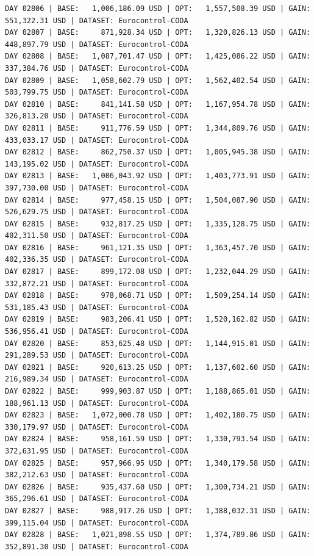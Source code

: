 \documentclass[11pt,a4paper]{article}
\begin{document}
\begin{verbatim}
DAY 02806 | BASE:   1,006,186.09 USD | OPT:   1,557,508.39 USD | GAIN: 551,322.31 USD | DATASET: Eurocontrol-CODA
DAY 02807 | BASE:     871,928.34 USD | OPT:   1,320,826.13 USD | GAIN: 448,897.79 USD | DATASET: Eurocontrol-CODA
DAY 02808 | BASE:   1,087,701.47 USD | OPT:   1,425,086.22 USD | GAIN: 337,384.76 USD | DATASET: Eurocontrol-CODA
DAY 02809 | BASE:   1,058,602.79 USD | OPT:   1,562,402.54 USD | GAIN: 503,799.75 USD | DATASET: Eurocontrol-CODA
DAY 02810 | BASE:     841,141.58 USD | OPT:   1,167,954.78 USD | GAIN: 326,813.20 USD | DATASET: Eurocontrol-CODA
DAY 02811 | BASE:     911,776.59 USD | OPT:   1,344,809.76 USD | GAIN: 433,033.17 USD | DATASET: Eurocontrol-CODA
DAY 02812 | BASE:     862,750.37 USD | OPT:   1,005,945.38 USD | GAIN: 143,195.02 USD | DATASET: Eurocontrol-CODA
DAY 02813 | BASE:   1,006,043.92 USD | OPT:   1,403,773.91 USD | GAIN: 397,730.00 USD | DATASET: Eurocontrol-CODA
DAY 02814 | BASE:     977,458.15 USD | OPT:   1,504,087.90 USD | GAIN: 526,629.75 USD | DATASET: Eurocontrol-CODA
DAY 02815 | BASE:     932,817.25 USD | OPT:   1,335,128.75 USD | GAIN: 402,311.50 USD | DATASET: Eurocontrol-CODA
DAY 02816 | BASE:     961,121.35 USD | OPT:   1,363,457.70 USD | GAIN: 402,336.35 USD | DATASET: Eurocontrol-CODA
DAY 02817 | BASE:     899,172.08 USD | OPT:   1,232,044.29 USD | GAIN: 332,872.21 USD | DATASET: Eurocontrol-CODA
DAY 02818 | BASE:     978,068.71 USD | OPT:   1,509,254.14 USD | GAIN: 531,185.43 USD | DATASET: Eurocontrol-CODA
DAY 02819 | BASE:     983,206.41 USD | OPT:   1,520,162.82 USD | GAIN: 536,956.41 USD | DATASET: Eurocontrol-CODA
DAY 02820 | BASE:     853,625.48 USD | OPT:   1,144,915.01 USD | GAIN: 291,289.53 USD | DATASET: Eurocontrol-CODA
DAY 02821 | BASE:     920,613.25 USD | OPT:   1,137,602.60 USD | GAIN: 216,989.34 USD | DATASET: Eurocontrol-CODA
DAY 02822 | BASE:     999,903.87 USD | OPT:   1,188,865.01 USD | GAIN: 188,961.13 USD | DATASET: Eurocontrol-CODA
DAY 02823 | BASE:   1,072,000.78 USD | OPT:   1,402,180.75 USD | GAIN: 330,179.97 USD | DATASET: Eurocontrol-CODA
DAY 02824 | BASE:     958,161.59 USD | OPT:   1,330,793.54 USD | GAIN: 372,631.95 USD | DATASET: Eurocontrol-CODA
DAY 02825 | BASE:     957,966.95 USD | OPT:   1,340,179.58 USD | GAIN: 382,212.63 USD | DATASET: Eurocontrol-CODA
DAY 02826 | BASE:     935,437.60 USD | OPT:   1,300,734.21 USD | GAIN: 365,296.61 USD | DATASET: Eurocontrol-CODA
DAY 02827 | BASE:     988,917.26 USD | OPT:   1,388,032.31 USD | GAIN: 399,115.04 USD | DATASET: Eurocontrol-CODA
DAY 02828 | BASE:   1,021,898.55 USD | OPT:   1,374,789.86 USD | GAIN: 352,891.30 USD | DATASET: Eurocontrol-CODA

\end{verbatim}
\end{document}
